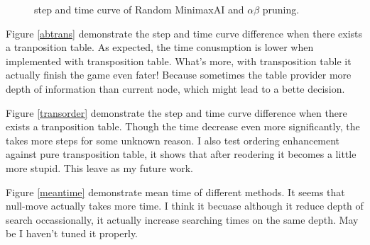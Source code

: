 \documentclass{article}
\begin{document}
\begin{figure}[!h]
\normalsize
\centering
{}
\caption{step and time curve of Random MinimaxAI and $\alpha\beta$ pruning.}
\label{miniab} %
\end{figure}

Figure \ref{abtrans} demonstrate the step and time curve difference when there exists a tranposition table. As expected, the time conusmption is lower when implemented with transposition table. What's more, with transposition table it actually finish the game even fater! Because sometimes the table provider more depth of information than current node, which might lead to a bette decision.

Figure \ref{transorder} demonstrate the step and time curve difference when there exists a tranposition table. Though the time decrease even more significantly, the takes more steps for some unknown reason. I also test ordering enhancement against pure transposition table, it shows that after reodering it becomes a little more stupid. This leave as my future work.

Figure \ref{meantime} demonstrate mean time of different methods. It seems that null-move actually takes more time. I think it becuase although it reduce depth of search occassionally, it actually increase searching times on the same depth. May be I haven't tuned it properly. 
\end{document}
